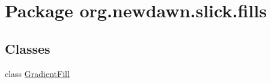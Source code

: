 \hypertarget{namespaceorg_1_1newdawn_1_1slick_1_1fills}{}\section{Package org.\+newdawn.\+slick.\+fills}
\label{namespaceorg_1_1newdawn_1_1slick_1_1fills}
\subsection*{Classes}
\begin{DoxyCompactItemize}
\item 
class \mbox{\hyperlink{classorg_1_1newdawn_1_1slick_1_1fills_1_1_gradient_fill}{Gradient\+Fill}}
\end{DoxyCompactItemize}
